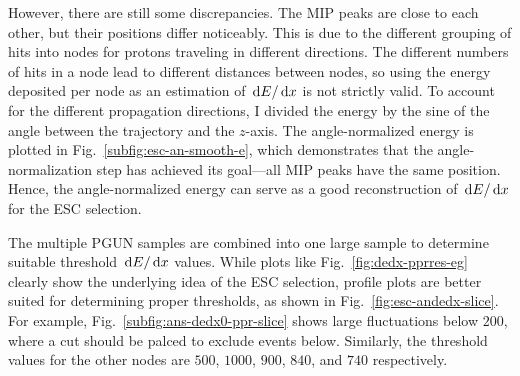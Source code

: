      However, there are still some discrepancies.
     The MIP peaks are close to each other, but their positions differ noticeably.
     This is due to the different grouping of hits into nodes for protons traveling in different directions.
     The different numbers of hits in a node lead to different distances between nodes, so using the energy deposited per node as an estimation of $\,\textrm{d}E/\,\textrm{d}x$ is not strictly valid.
     To account for the different propagation directions, I divided the energy by the sine of the angle between the trajectory and the $z$-axis.
     The angle-normalized energy is plotted in Fig.~\ref{subfig:esc-an-smooth-e}, which demonstrates that the angle-normalization step has achieved its goal—all MIP peaks have the same position.
     Hence, the angle-normalized energy can serve as a good reconstruction of $\,\textrm{d}E/\,\textrm{d}x$ for the ESC selection.

     The multiple PGUN samples are combined into one large sample to determine suitable threshold $\,\textrm{d}E/\,\textrm{d}x$ values.
     While plots like Fig.~\ref{fig:dedx-pprres-eg} clearly show the underlying idea of the ESC selection, profile plots are better suited for determining proper thresholds, as shown in Fig.~\ref{fig:esc-andedx-slice}.
     For example, Fig.~\ref{subfig:ans-dedx0-ppr-slice} shows large fluctuations below $200$, where a cut should be palced to exclude events below.
     Similarly, the threshold values for the other nodes are $500$, $1000$, $900$, $840$, and $740$ respectively.

